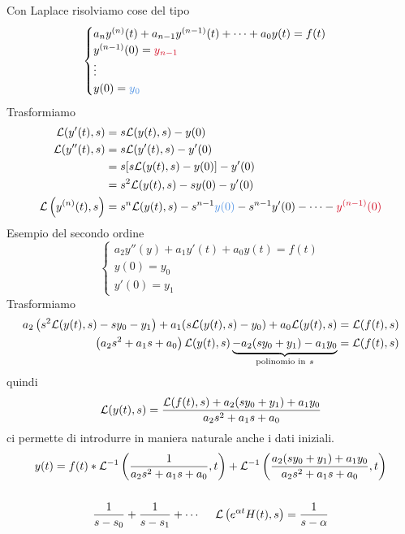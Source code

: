 Con Laplace risolviamo cose del tipo
\begin{equation*}
\begin{cases}
a_{n} y^{(n)}(t) + a_{n - 1} y^{(n - 1)}(t) + \cdots + a_{0} y(t) = f(t)\\
y^{(n - 1)}(0) = \textcolor[rgb]{0.82, 0.01, 0.11}{y}\textcolor[rgb]{0.82, 0.01, 0.11}{_{n - 1}}\\
\vdots \\
y(0) = \textcolor[rgb]{0.29, 0.56, 0.89}{y}\textcolor[rgb]{0.29, 0.56, 0.89}{_{0}}
\end{cases}
\end{equation*}
Trasformiamo
\begin{align*}
\Lc(y'(t), s) & = s\Lc(y(t), s) - y(0)\\
\Lc(y''(t), s) & = s\Lc(y'(t), s) - y'(0)\\
 & = s[s\Lc(y(t), s) - y(0)] - y'(0)\\
 & = s^{2}\Lc(y(t), s) - sy(0) - y'(0)\\
\Lc\left(y^{(n)}(t), s\right) & = s^{n}\Lc(y(t), s) - s^{n - 1}\textcolor[rgb]{0.29, 0.56, 0.89}{y}\textcolor[rgb]{0.29, 0.56, 0.89}{(}\textcolor[rgb]{0.29, 0.56, 0.89}{0}\textcolor[rgb]{0.29, 0.56, 0.89}{)} - s^{n - 1} y'(0) - \cdots - \textcolor[rgb]{0.82, 0.01, 0.11}{y}\textcolor[rgb]{0.82, 0.01, 0.11}{^{(n - 1)}}\textcolor[rgb]{0.82, 0.01, 0.11}{(}\textcolor[rgb]{0.82, 0.01, 0.11}{0}\textcolor[rgb]{0.82, 0.01, 0.11}{)}
\end{align*}
Esempio del secondo ordine
\begin{equation*}
\begin{cases}
a_{2} y''(y) + a_{1} y'(t) + a_{0} y(t) = f(t)\\
y(0) = y_{0}\\
y'(0) = y_{1}
\end{cases}
\end{equation*}
Trasformiamo
\begin{align*}
a_{2}\left(s^{2}\mathcal{L}(y(t), s) - sy_{0} - y_{1}\right) + a_{1}(s\mathcal{L}(y(t), s) - y_{0}) + a_{0}\mathcal{L}(y(t), s) & = \mathcal{L}(f(t), s)\\
\left(a_{2} s^{2} + a_{1} s + a_{0}\right)\mathcal{L}(y(t), s)\underbrace{- a_{2}(sy_{0} + y_{1}) - a_{1} y_{0}}_{\text{polinomio in} \ s} & = \mathcal{L}(f(t), s)
\end{align*}
quindi
\begin{equation*}
	\mathcal{L}(y(t), s) = \frac{\mathcal{L}(f(t), s) + a_{2}(sy_{0} + y_{1}) + a_{1} y_{0}}{a_{2} s^{2} + a_{1} s + a_{0}}
\end{equation*}
ci permette di introdurre in maniera naturale anche i dati iniziali.
\begin{gather*}
y(t) = f(t) *\Lc^{- 1}\left(\frac{1}{a_{2} s^{2} + a_{1} s + a_{0}}, t\right) + \Lc^{- 1}\left(\frac{a_{2}(sy_{0} + y_{1}) + a_{1} y_{0}}{a_{2} s^{2} + a_{1} s + a_{0}}, t\right)\\
\\
\frac{1}{s - s_{0}} + \frac{1}{s - s_{1}} + \cdots \ \ \ \ \Lc\left(e^{\alpha t} H(t), s\right) = \frac{1}{s - \alpha}
\end{gather*}

